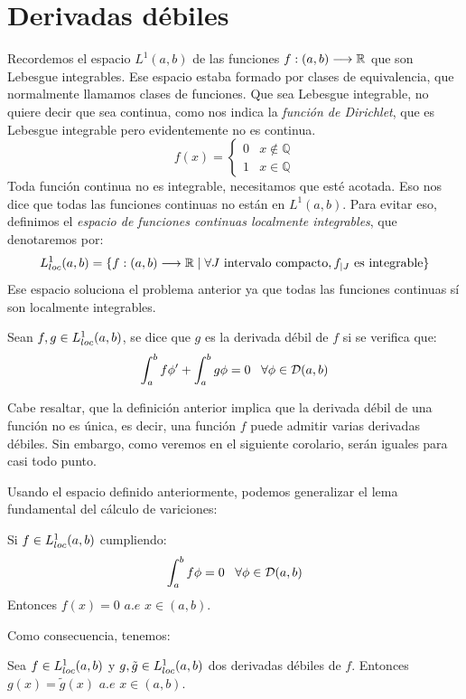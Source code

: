 \section{Derivadas débiles}

Recordemos el espacio $L^1(a,b)$ de las funciones $f : (a,b) \longrightarrow \mathbb{R}$ que son Lebesgue integrables. Ese espacio estaba formado por clases de equivalencia, que normalmente llamamos clases de funciones. Que sea Lebesgue integrable, no quiere decir que sea continua, como nos indica la \textit{función de Dirichlet}, que es Lebesgue integrable pero evidentemente no es continua.
\[
f(x)=\left\{
\begin{array}{cc}
0 & x\notin\mathbb{Q} \\
1 & x\in\mathbb{Q}
\end{array}
\right. 
\]
Toda función continua no es integrable, necesitamos que esté acotada. Eso nos dice que todas las funciones continuas no están en $L^1(a,b)$. Para evitar eso, definimos el \textit{espacio de funciones continuas localmente integrables}, que denotaremos por:
\[
L^1_{loc}(a,b)=\{f : (a,b) \longrightarrow \mathbb{R} \;|\; \forall J \text{ intervalo compacto},f_{|J}\text{ es integrable}\}
\]
Ese espacio soluciona el problema anterior ya que todas las funciones continuas sí son localmente integrables.

\begin{definition}
Sean $f,g\in L^1_{loc}(a,b)$, se dice que $g$ es la derivada débil de $f$ si se verifica que:
\[
\displaystyle\int_{ a }^{ b } f\phi'+\displaystyle\int_{ a }^{ b } g\phi=0 \;\;\; \forall\phi\in\mathcal{D}(a,b)
\]
\end{definition}

Cabe resaltar, que la definición anterior implica que la derivada débil de una función no es única, es decir, una función $f$ puede admitir varias derivadas débiles. Sin embargo, como veremos en el siguiente corolario, serán iguales para casi todo punto.

Usando el espacio definido anteriormente, podemos generalizar el lema fundamental del cálculo de variciones:

\begin{lemma}
Si $f\in L^1_{loc}(a,b)$ cumpliendo:
\[
\displaystyle\int_{ a }^{ b } f\phi=0 \;\;\;\forall\phi\in\mathcal{D}(a,b)
\]
Entonces $f(x)=0$ $a.e$ $x\in(a,b)$.

\end{lemma}

Como consecuencia, tenemos:

\begin{coro}
Sea $f\in L^1_{loc}(a,b)$ y $g,\tilde{g}\in L^1_{loc}(a,b)$ dos derivadas débiles de $f$. Entonces $g(x)=\tilde{g}(x)$ $a.e$ $x\in(a,b)$.
\end{coro}

